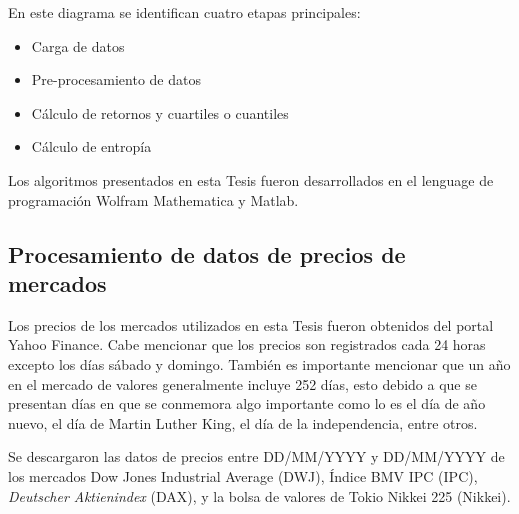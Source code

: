 En este diagrama se identifican cuatro etapas principales:

\begin{itemize}
	\item Carga de datos
	\item Pre-procesamiento de datos
	\item Cálculo de retornos y cuartiles o cuantiles
	\item Cálculo de entropía
\end{itemize}

Los algoritmos presentados en esta Tesis fueron desarrollados en el lenguage de programación Wolfram Mathematica y Matlab.


\subsection{Procesamiento de datos de precios de mercados}
\label{sec_data}
Los precios de los mercados utilizados en esta Tesis fueron obtenidos del portal Yahoo Finance. 
Cabe mencionar que los precios son registrados cada 24 horas excepto los días sábado y domingo. También es importante mencionar que un año en el mercado de valores generalmente incluye 252 días, esto debido a que se presentan días en que se conmemora algo importante como lo es el día de año nuevo, el día de Martin Luther King, el día de la independencia, entre otros. 

Se descargaron las datos de precios entre DD/MM/YYYY y DD/MM/YYYY de los mercados Dow Jones Industrial Average (DWJ), Índice BMV IPC (IPC), \textit{Deutscher Aktienindex} (DAX), y la bolsa de valores de Tokio Nikkei 225 (Nikkei).

